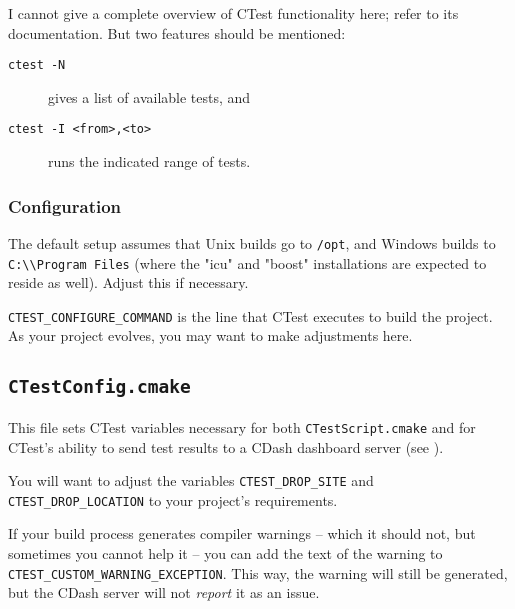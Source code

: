 I cannot give a complete overview of CTest functionality here; refer to its documentation. But two features should be mentioned:

\begin{description}
\item[\texttt{ctest -N}] gives a list of available tests, and
\item[\texttt{ctest -I <from>,<to>}] runs the indicated range of tests.
\end{description}

\subsubsection{Configuration}

The default setup assumes that Unix builds go to \lstinline{/opt}, and Windows builds to \lstinline{C:\\Program Files} (where the "icu" and "boost" installations are expected to reside as well). Adjust this if necessary.

\lstinline{CTEST_CONFIGURE_COMMAND} is the line that CTest executes to build the project. As your project evolves, you may want to make adjustments here.

\subsection{\texttt{CTestConfig.cmake}}

This file sets CTest variables necessary for both \lstinline{CTestScript.cmake} and for CTest's ability to send test results to a CDash dashboard server (see ).

You will want to adjust the variables \lstinline{CTEST_DROP_SITE} and \lstinline{CTEST_DROP_LOCATION} to your project's requirements.

If your build process generates compiler warnings -- which it should not, but sometimes you cannot help it -- you can add the text of the warning to \lstinline{CTEST_CUSTOM_WARNING_EXCEPTION}. This way, the warning will still be generated, but the CDash server will not \emph{report} it as an issue.

